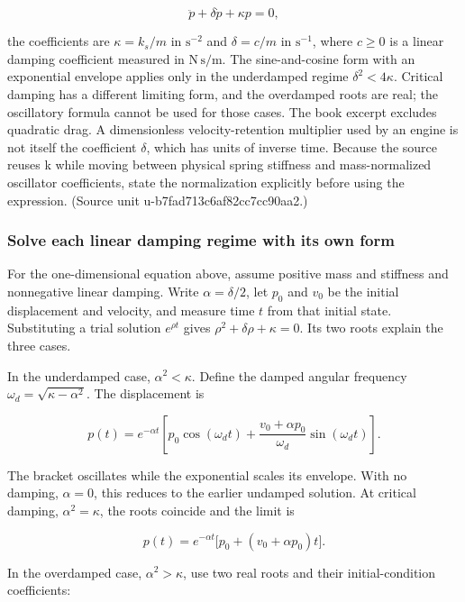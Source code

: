 \[
\ddot p+\delta\dot p+\kappa p=0,
\]

the coefficients are \(\kappa=k_s/m\) in \(\mathrm{s^{-2}}\) and \(\delta=c/m\) in \(\mathrm{s^{-1}}\), where \(c\geq0\) is a linear damping coefficient measured in \(\mathrm{N\,s/m}\). The sine-and-cosine form with an exponential envelope applies only in the underdamped regime \(\delta^2<4\kappa\). Critical damping has a different limiting form, and the overdamped roots are real; the oscillatory formula cannot be used for those cases. The book excerpt excludes quadratic drag. A dimensionless velocity-retention multiplier used by an engine is not itself the coefficient \(\delta\), which has units of inverse time. Because the source reuses k while moving between physical spring stiffness and mass-normalized oscillator coefficients, state the normalization explicitly before using the expression. (Source unit u-b7fad713c6af82cc7cc90aa2.)

\subsubsection{Solve each linear damping regime with its own form}\label{06-engine-ii-ch047-solve-each-linear-damping-regime-with-its-own-form}

\hypertarget{06-engine-ii-ch047-solve-each-linear-damping-regime-with-its-own-form}{}

For the one-dimensional equation above, assume positive mass and stiffness and nonnegative linear damping. Write \(\alpha=\delta/2\), let \(p_0\) and \(v_0\) be the initial displacement and velocity, and measure time \(t\) from that initial state. Substituting a trial solution \(e^{\rho t}\) gives \(\rho^2+\delta\rho+\kappa=0\). Its two roots explain the three cases.

In the underdamped case, \(\alpha^2<\kappa\). Define the damped angular frequency \(\omega_d=\sqrt{\kappa-\alpha^2}\). The displacement is

\[
p(t)=e^{-\alpha t}\left[p_0\cos(\omega_d t)
+\frac{v_0+\alpha p_0}{\omega_d}\sin(\omega_d t)\right].
\]

The bracket oscillates while the exponential scales its envelope. With no damping, \(\alpha=0\), this reduces to the earlier undamped solution. At critical damping, \(\alpha^2=\kappa\), the roots coincide and the limit is

\[
p(t)=e^{-\alpha t}\bigl[p_0+(v_0+\alpha p_0)t\bigr].
\]

In the overdamped case, \(\alpha^2>\kappa\), use two real roots and their initial-condition coefficients:

